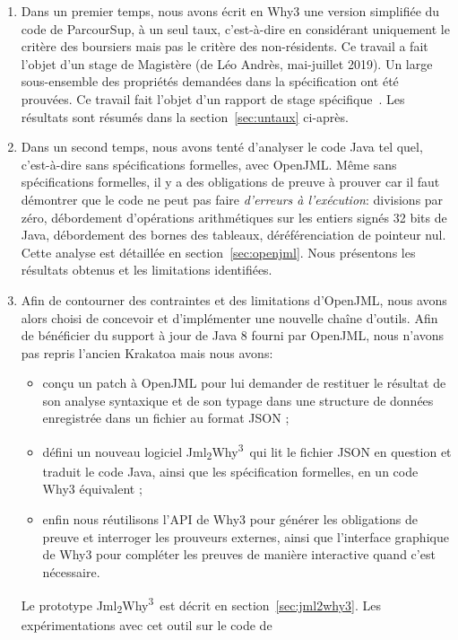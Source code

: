 \documentclass[a4paper]{report}
\newcommand{\jmlwhy}{\texorpdfstring{Jml\textsubscript{2}Why\textsuperscript{3}}{Jml2Why3}}
\begin{document}
\begin{enumerate}
\item Dans un premier temps, nous avons écrit en Why3 une version simplifiée du
  code de ParcourSup, à un seul taux, c'est-à-dire en considérant
  uniquement le critère des boursiers mais pas le critère des non-résidents. Ce
  travail a fait l'objet d'un stage de Magistère (de Léo Andrès, mai-juillet
  2019). Un large sous-ensemble des propriétés demandées dans la spécification
  ont été prouvées. Ce travail fait l'objet d'un rapport de stage
  spécifique~\cite{andres19rr}. Les
  résultats sont résumés dans la section~\ref{sec:untaux} ci-après.
\item Dans un second temps, nous avons tenté d'analyser le code Java tel quel,
  c'est-à-dire sans spécifications formelles, avec OpenJML. Même sans
  spécifications formelles, il y a des obligations de preuve à prouver car il
  faut démontrer que le code ne peut pas faire \emph{d'erreurs à l'exécution}:
  divisions par zéro, débordement d'opérations arithmétiques sur les entiers
  signés 32 bits de Java, débordement des bornes des tableaux, déréférenciation
  de pointeur nul. Cette analyse est détaillée en
  section~\ref{sec:openjml}. Nous présentons les résultats obtenus et les
  limitations identifiées.
\item Afin de contourner des contraintes et des limitations d'OpenJML, nous
  avons alors choisi de concevoir et d'implémenter une nouvelle chaîne
  d'outils. Afin de bénéficier du support à jour de Java 8 fourni par OpenJML,
  nous n'avons pas repris l'ancien Krakatoa mais nous avons:
  \begin{itemize}
  \item conçu un patch à OpenJML pour lui demander de restituer le résultat de son analyse syntaxique et de son typage dans une structure de données enregistrée dans un fichier au format JSON ;
  \item défini un nouveau logiciel \jmlwhy\ qui lit le fichier JSON en question et traduit le code Java, ainsi que les spécification formelles, en un code Why3 équivalent ;
  \item enfin nous réutilisons l'API de Why3 pour générer les obligations de
    preuve et interroger les prouveurs externes, ainsi que l'interface graphique
    de Why3 pour compléter les preuves de manière interactive quand c'est
    nécessaire.
  \end{itemize}
  Le prototype  \jmlwhy\ est décrit en
  section~\ref{sec:jml2why3}. Les expérimentations avec cet outil sur le code de

\end{enumerate}
\end{document}
